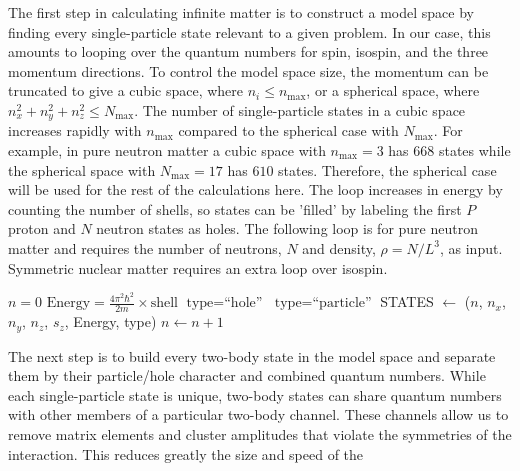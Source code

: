   The first step in calculating infinite matter is to construct a
  model space by finding every single-particle state relevant to a
  given problem. In our case, this amounts to looping over the quantum
  numbers for spin, isospin, and the three momentum directions. To
  control the model space size, the momentum can be truncated to give
  a cubic space, where $n_{i}\leq n_{\text{max}}$, or a spherical
  space, where $n_{x}^{2}+n_{y}^{2}+n_{z}^{2}\leq N_{\text{max}}$. The
  number of single-particle states in a cubic space increases rapidly
  with $n_{\text{max}}$ compared to the spherical case with
  $N_{\text{max}}$. For example, in pure neutron matter a cubic space
  with $n_{\text{max}}=3$ has $668$ states while the spherical space
  with $N_{\text{max}}=17$ has $610$ states. Therefore, the spherical
  case will be used for the rest of the calculations here. The loop
  increases in energy by counting the number of shells, so states can
  be 'filled' by labeling the first $P$ proton and $N$ neutron states
  as holes. The following loop is for pure neutron matter and requires
  the number of neutrons, $N$ and density, $\rho=N/L^{3}$, as
  input. Symmetric nuclear matter requires an extra loop over isospin.
\begin{svgraybox}
  \begin{algorithmic}
    \State $n=0$ 
     \State
    $\text{Energy}=\frac{4\pi^{2}\hbar^{2}}{2m}\times\text{shell}$
     \State $\text{type}=\text{``hole''}$ \Else \State
    $\text{type}=\text{``particle''}$ \EndIf \State STATES $\gets$
    ($n$, $n_{x}$, $n_{y}$, $n_{z}$, $s_{z}$, Energy, type) \State
    $n\gets n+1$ \EndIf \EndFor \EndFor \EndFor \EndFor \EndFor
  \end{algorithmic}
\end{svgraybox}
  The next step is to build every two-body state in the model space
  and separate them by their particle/hole character and combined
  quantum numbers. While each single-particle state is unique,
  two-body states can share quantum numbers with other members of a
  particular two-body channel. These channels allow us to remove
  matrix elements and cluster amplitudes that violate the symmetries
  of the interaction. This reduces greatly the size and speed of the
